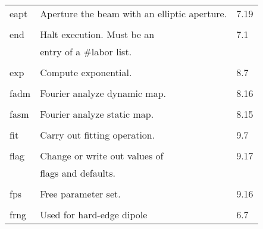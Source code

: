 \begin{center}
\begin{tabular}{lll}
\hspace{1.5em}eapt  & Aperture the beam with an elliptic aperture. & \hspace{2em}7.19\\
\vspace{-3mm}& &\\
\hspace{1.5em}end   &    Halt execution.  Must be an     & \hspace{2em}7.1\\
                    & entry of a \#labor list.               &\\
\vspace{-3mm}& &\\
\hspace{1.5em}exp     &    Compute exponential.           &  \hspace{2em}8.7\\
\vspace{-3mm}& &\\
\hspace{1.5em}fadm    &   Fourier analyze dynamic map.   &  \hspace{2em}8.16\\
\vspace{-3mm}& &\\
\hspace{1.5em}fasm    &     Fourier analyze static map.    &  \hspace{2em}8.15\\
\vspace{-3mm}& &\\
\hspace{1.5em}fit    &  Carry out fitting operation.    &        \hspace{2em}9.7\\
\vspace{-3mm}& &\\
\hspace{1.5em}flag   &   Change or write out values of &    \hspace{2em}9.17\\
           &   flags and defaults. &\\
\vspace{-3mm}& &\\
\hspace{1.5em}fps   &  Free parameter set.          &          \hspace{2em}9.16\\
\vspace{-3mm}& &\\
\hspace{1.5em}frng    &    Used for hard-edge dipole     &  \hspace{2em}6.7 \\

\end{tabular}
\end{center}

